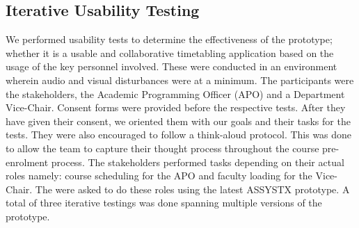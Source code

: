 \subsection{Iterative Usability Testing}
We performed usability tests to determine the effectiveness of the prototype; whether it is a usable and collaborative timetabling application based on the usage of the key personnel involved. These were conducted in an environment wherein audio and visual disturbances were at a minimum. The participants were the stakeholders, the Academic Programming Officer (APO) and a Department Vice-Chair. Consent forms were provided before the respective tests. After they have given their consent, we oriented them with our goals and their tasks for the tests. They were also encouraged to follow a think-aloud protocol. This was done to allow the team to capture their thought process throughout the course pre-enrolment process. The stakeholders performed tasks depending on their actual roles namely:  course scheduling for the APO and faculty loading for the Vice-Chair. The were asked to do these roles using the latest ASSYSTX prototype. A total of three iterative testings was done spanning multiple versions of the prototype. 

